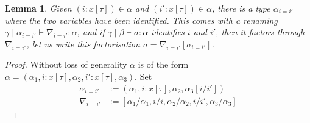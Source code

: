 \documentclass[10pt]{article}
\newtheorem{lemma}{Lemma}
\newcommand{\yields}{\vdash}
\begin{document}
\begin{lemma}
Given $(i : x[\tau]) \in \alpha$ and $(i' : x[\tau]) \in \alpha$, there is a type $\alpha_{i=i'}$ where the two variables have been identified. This comes with a renaming $\gamma \mid \alpha_{i=i'} \yields \nabla_{i=i'} : \alpha$, and if $\gamma \mid \beta \yields \sigma : \alpha$ identifies $i$ and $i'$, then it factors through $\nabla_{i=i'}$, let us write this factorisation $\sigma = \nabla_{i=i'}[\sigma_{i=i'}]$.
\end{lemma}
\begin{proof}
Without loss of generality $\alpha$ is of the form $\alpha = (\alpha_1, i : x[\tau], \alpha_2, i' : x[\tau], \alpha_3)$. Set 
\begin{align*}
\alpha_{i=i'} &:= (\alpha_1, i : x[\tau], \alpha_2, \alpha_3[i/i']) \\
\nabla_{i=i'} &:= [\alpha_1/\alpha_1, i / i, \alpha_2/\alpha_2, i / i', \alpha_3/\alpha_3]
\end{align*}

\end{proof}
\end{document}
